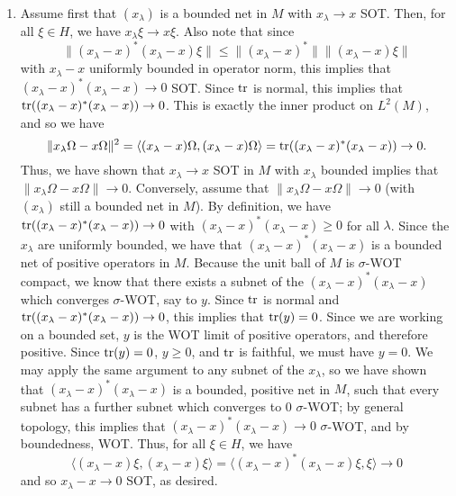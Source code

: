 \documentclass[a4paper,10pt]{report}
\begin{document}
\begin{enumerate}
		\begin{enumerate}
			\item Assume first that $(x_\lambda)$ is a bounded net in $M$ with $x_\lambda \rightarrow x$ SOT.  Then, for all $\xi\in H$, we have $x_\lambda \xi \rightarrow x\xi$.  Also note that since $$\|(x_\lambda - x)^* (x_\lambda - x)\xi \| \leq \|(x_\lambda - x)^*\| \|(x_\lambda - x)\xi \|$$ with $x_\lambda - x$ uniformly bounded in operator norm, this implies that $(x_\lambda - x)^*(x_\lambda - x) \rightarrow 0$ SOT.  Since $\operatorname{tr}$ is normal, this implies that $\operatorname{tr}((x_\lambda - x)^*(x_\lambda - x)) \rightarrow 0$.  This is exactly the inner product on $L^2(M)$, and so we have $$\|x_\lambda\Omega - x\Omega \|^2 =  \langle (x_\lambda - x)\Omega, (x_\lambda - x)\Omega \rangle = \operatorname{tr}((x_\lambda - x)^*(x_\lambda - x)) \rightarrow 0.$$ Thus, we have shown that $x_\lambda \rightarrow x$ SOT in $M$ with $x_\lambda$ bounded implies that $\|x_\lambda\Omega - x\Omega \| \rightarrow 0$.
			\newline
			\newline 
				Conversely, assume that $\|x_\lambda\Omega - x\Omega \|\rightarrow 0$ (with $(x_\lambda)$ still a bounded net in $M$).
			 By definition, we have $\operatorname{tr}((x_\lambda - x)^*(x_\lambda - x)) \rightarrow 0$ with $(x_\lambda - x)^*(x_\lambda - x) \geq 0$ for all $\lambda$. 
				Since the $x_\lambda$ are uniformly bounded, we have that $(x_\lambda - x)^*(x_\lambda - x)$ is a bounded net of positive operators in $M$. 
				Because the unit ball of $M$ is $\sigma$-WOT compact, we know that there exists a subnet of the $(x_\lambda - x)^*(x_\lambda - x)$ which converges $\sigma$-WOT, say to $y$.  Since $\operatorname{tr}$ is normal and $\operatorname{tr}((x_\lambda - x)^*(x_\lambda - x)) \rightarrow 0$, this implies that $\operatorname{tr}(y) = 0$.  
				Since we are working on a bounded set, $y$ is the WOT limit of positive operators, and therefore positive. 
				Since $\operatorname{tr}(y)=0$, $y \geq 0$, and $\operatorname{tr}$ is faithful, we must have $y=0$. 
				We may apply the same argument to any subnet of the $x_\lambda$, so we have shown that $(x_\lambda - x)^*(x_\lambda - x)$ is a bounded, positive net in $M$, such that every subnet has a further subnet which converges to $0$ $\sigma$-WOT; by general topology, this implies that $(x_\lambda-x)^*(x_\lambda-x)\to 0$ $\sigma$-WOT, and by boundedness, WOT. 
			 Thus, for all $\xi\in H$, we have $$\langle (x_\lambda - x)\xi, (x_\lambda - x)\xi \rangle = \langle (x_\lambda - x)^*(x_\lambda - x)\xi,\xi \rangle \rightarrow 0$$ and so $x_\lambda - x \rightarrow 0$ SOT, as desired. 

\end{enumerate}
\end{enumerate}
\end{document}
